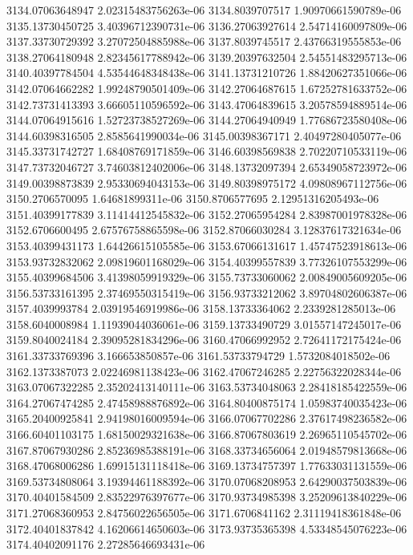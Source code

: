 {3134.07063648947 2.02315483756263e-06
3134.8039707517 1.90970661590789e-06
3135.13730450725 3.40396712390731e-06
3136.27063927614 2.54714160097809e-06
3137.33730729392 3.27072504885988e-06
3137.8039745517 2.43766319555853e-06
3138.27064180948 2.82345617788942e-06
3139.20397632504 2.54551483295713e-06
3140.40397784504 4.53544648348438e-06
3141.13731210726 1.88420627351066e-06
3142.07064662282 1.99248790501409e-06
3142.27064687615 1.67252781633752e-06
3142.73731413393 3.66605110596592e-06
3143.47064839615 3.20578594889514e-06
3144.07064915616 1.52723738527269e-06
3144.27064940949 1.77686723580408e-06
3144.60398316505 2.8585641990034e-06
3145.00398367171 2.40497280405077e-06
3145.33731742727 1.68408769171859e-06
3146.60398569838 2.70220710533119e-06
3147.73732046727 3.74603812402006e-06
3148.13732097394 2.65349058723972e-06
3149.00398873839 2.95330694043153e-06
3149.80398975172 4.09808967112756e-06
3150.2706570095 1.64681899311e-06
3150.8706577695 2.12951316205493e-06
3151.40399177839 3.11414412545832e-06
3152.27065954284 2.83987001978328e-06
3152.6706600495 2.67576758865598e-06
3152.87066030284 3.12837617321634e-06
3153.40399431173 1.64426615105585e-06
3153.67066131617 1.45747523918613e-06
3153.93732832062 2.09819601168029e-06
3154.40399557839 3.77326107553299e-06
3155.40399684506 3.41398059919329e-06
3155.73733060062 2.00849005609205e-06
3156.53733161395 2.37469550315419e-06
3156.93733212062 3.89704802606387e-06
3157.4039993784 2.03919546919986e-06
3158.13733364062 2.2339281285013e-06
3158.6040008984 1.11939044036061e-06
3159.13733490729 3.01557147245017e-06
3159.8040024184 2.39095281834296e-06
3160.47066992952 2.72641172175424e-06
3161.33733769396 3.166653850857e-06
3161.53733794729 1.5732084018502e-06
3162.1373387073 2.02246981138423e-06
3162.47067246285 2.22756322028344e-06
3163.07067322285 2.35202413140111e-06
3163.53734048063 2.28418185422559e-06
3164.27067474285 2.47458988876892e-06
3164.80400875174 1.05983740035423e-06
3165.20400925841 2.94198016009594e-06
3166.07067702286 2.37617498236582e-06
3166.60401103175 1.68150029321638e-06
3166.87067803619 2.26965110545702e-06
3167.87067930286 2.85236985388191e-06
3168.33734656064 2.01948579813668e-06
3168.47068006286 1.69915131118418e-06
3169.13734757397 1.77633031131559e-06
3169.53734808064 3.19394461188392e-06
3170.07068208953 2.64290037503839e-06
3170.40401584509 2.83522976397677e-06
3170.93734985398 3.25209613840229e-06
3171.27068360953 2.84756022656505e-06
3171.6706841162 2.31119418361848e-06
3172.40401837842 4.16206614650603e-06
3173.93735365398 4.53348545076223e-06
3174.40402091176 2.27285646693431e-06
}
